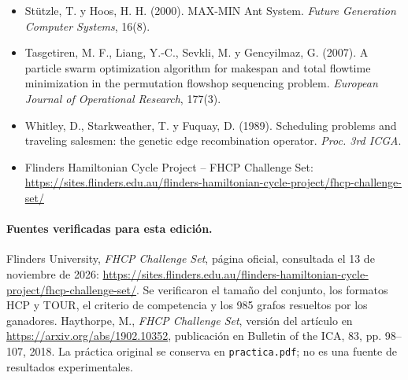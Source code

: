 \documentclass[
  spanish,
  12pt,
]{article}
\begin{document}
\begin{itemize}
  \emph{Journal of Global Optimization}, 11(4).
\item
  Stützle, T. y Hoos, H. H. (2000). MAX-MIN Ant System. \emph{Future
  Generation Computer Systems}, 16(8).
\item
  Tasgetiren, M. F., Liang, Y.-C., Sevkli, M. y Gencyilmaz, G. (2007). A
  particle swarm optimization algorithm for makespan and total flowtime
  minimization in the permutation flowshop sequencing problem.
  \emph{European Journal of Operational Research}, 177(3).
\item
  Whitley, D., Starkweather, T. y Fuquay, D. (1989). Scheduling problems
  and traveling salesmen: the genetic edge recombination operator.
  \emph{Proc. 3rd ICGA}.
\item
  Flinders Hamiltonian Cycle Project -- FHCP Challenge Set:
  \url{https://sites.flinders.edu.au/flinders-hamiltonian-cycle-project/fhcp-challenge-set/}
\end{itemize}


\paragraph{Fuentes verificadas para esta edición.}
Flinders University, \emph{FHCP Challenge Set}, página oficial, consultada el 13 de noviembre de 2026: \url{https://sites.flinders.edu.au/flinders-hamiltonian-cycle-project/fhcp-challenge-set/}. Se verificaron el tamaño del conjunto, los formatos HCP y TOUR, el criterio de competencia y los 985 grafos resueltos por los ganadores. Haythorpe, M., \emph{FHCP Challenge Set}, versión del artículo en \url{https://arxiv.org/abs/1902.10352}, publicación en Bulletin of the ICA, 83, pp. 98--107, 2018. La práctica original se conserva en \texttt{practica.pdf}; no es una fuente de resultados experimentales.

\endgroup
\end{document}

